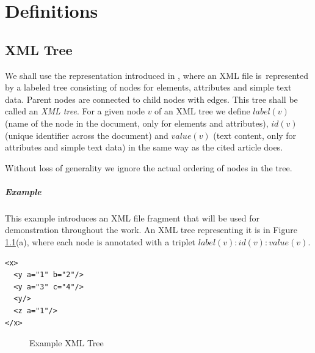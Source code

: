 \chapter{Definitions}
\label{chapter-definitions}

\section{XML Tree}

We shall use the representation introduced in \cite{fidax}, where an XML file is~represented by a labeled tree consisting of nodes for elements, attributes and simple text data. Parent nodes are connected to child nodes with edges. This tree shall be called an \textit{XML tree}. For a given node $v$ of an XML tree we define $label(v)$ (name of the node in the document, only for elements and attributes), $id(v)$ (unique identifier across the document) and $value(v)$ (text content, only for attributes and simple text data) in the same way as the cited article does.

Without loss of generality we ignore the actual ordering of nodes in the tree.

\paragraph{Example}

This example introduces an XML file fragment that will be used for demonstration throughout the work. An XML tree representing it is in Figure \ref{image-definitions-example-xml-tree}(a), where each node is annotated with a triplet $label(v) : id(v) : value(v)$.

\begin{verbatim}
<x>
  <y a="1" b="2"/>
  <y a="3" c="4"/>
  <y/>
  <z a="1"/>
</x>
\end{verbatim}

\begin{figure}
  \caption{Example XML Tree}
  \label{image-definitions-example-xml-tree} 
  \centering
\end{figure}

